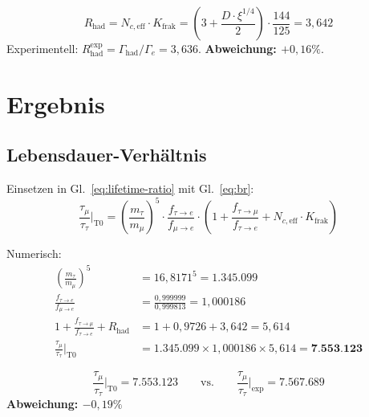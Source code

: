 	\begin{keypoint}
		\begin{equation}
			R_\text{had} = N_{c,\text{eff}} \cdot K_\text{frak} = \left(3 + \frac{D \cdot \xi^{1/4}}{2}\right) \cdot \frac{144}{125} = 3{,}642
			\label{eq:rhad}
		\end{equation}
		Experimentell: $R_\text{had}^\text{exp} = \Gamma_\text{had}/\Gamma_e = 3{,}636$. \textbf{Abweichung: $+0{,}16\%$}.
	\end{keypoint}
	
	
	\section{Ergebnis}
	
	\subsection{Lebensdauer-Verhältnis}
	
	Einsetzen in Gl.~\eqref{eq:lifetime-ratio} mit Gl.~\eqref{eq:br}:
	\begin{equation}
		\frac{\tau_\mu}{\tau_\tau}\bigg|_\text{T0} = \left(\frac{m_\tau}{m_\mu}\right)^5 \cdot \frac{f_{\tau \to e}}{f_{\mu \to e}} \cdot \left(1 + \frac{f_{\tau \to \mu}}{f_{\tau \to e}} + N_{c,\text{eff}} \cdot K_\text{frak}\right)
	\end{equation}
	
	Numerisch:
	\begin{align}
		\left(\frac{m_\tau}{m_\mu}\right)^5 &= 16{,}8171^5 = 1{.}345{.}099 \\
		\frac{f_{\tau \to e}}{f_{\mu \to e}} &= \frac{0{,}999999}{0{,}999813} = 1{,}000186 \\
		1 + \frac{f_{\tau \to \mu}}{f_{\tau \to e}} + R_\text{had} &= 1 + 0{,}9726 + 3{,}642 = 5{,}614 \\[6pt]
		\frac{\tau_\mu}{\tau_\tau}\bigg|_\text{T0} &= 1{.}345{.}099 \times 1{,}000186 \times 5{,}614 = \mathbf{7{.}553{.}123}
	\end{align}
	
	\begin{keypoint}[Hauptergebnis]
		\begin{equation}
			\frac{\tau_\mu}{\tau_\tau}\bigg|_\text{T0} = 7{.}553{.}123 \qquad \text{vs.} \qquad \frac{\tau_\mu}{\tau_\tau}\bigg|_\text{exp} = 7{.}567{.}689
		\end{equation}
		\textbf{Abweichung: $-0{,}19\%$}
	\end{keypoint}
	
